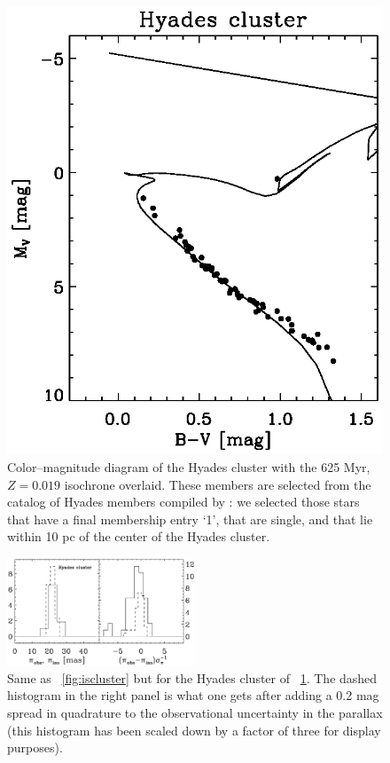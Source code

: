 \clearpage
\begin{figure}
\includegraphics{figs_groups/hyadesClusterCMD.ps}
\caption[Color--magnitude diagram of the Hyades cluster with the 625
  Myr, $Z=0.019$ isochrone overlaid]{Color--magnitude diagram of the
  Hyades cluster with the 625 Myr, $Z=0.019$ isochrone overlaid. These
  members are selected from the catalog of Hyades members compiled by
  \citet{Perryman98a}: we selected those stars that have a final
  membership entry `1', that are single, and that lie within 10 pc of
  the center of the Hyades cluster.}\label{fig:hyadesclustercmd}
\end{figure}

\clearpage
\begin{figure}
\includegraphics[width=0.5\textwidth]{figs_groups/hyadesClusterHist.eps}
\caption[Same as \figurename~\ref{fig:iscluster} but for the Hyades
cluster of \figurename~\ref{fig:hyadesclustercmd}]{Same as
\figurename~\ref{fig:iscluster} but for the Hyades cluster of
\figurename~\ref{fig:hyadesclustercmd}. The dashed histogram in the
right panel is what one gets after adding a 0.2 mag spread in
quadrature to the observational uncertainty in the parallax (this
histogram has been scaled down by a factor of three for display
purposes).}\label{fig:hyadesclusterhist}
\end{figure}

